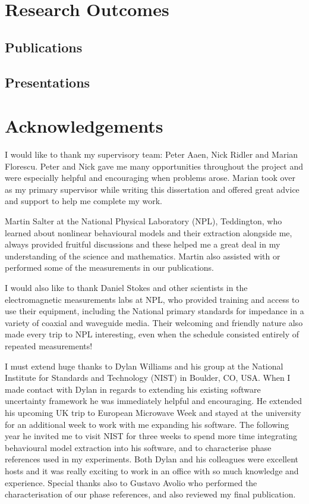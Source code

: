 \documentclass[../thesis/thesis.tex]{subfiles}
\begin{document}
\chapter*{Research Outcomes}
\begin{refsection}
\section*{Publications}
\nocite{Votsi_2020, Salter_2018, Stant_2018_TMTT, Stant_2017, Stant_2016, Stant_2016_Coll}
\printbibliography[heading=none]
\end{refsection}
\begin{refsection}
\section*{Presentations}
\nocite{Stant_2017_pgi, Stant_2017_feps, Stant_2016_pg}
\printbibliography[heading=none]
\end{refsection}
\chapter*{Acknowledgements}
I would like to thank my supervisory team: Peter Aaen, Nick Ridler and Marian Florescu. Peter and Nick gave me many opportunities throughout the project and were especially helpful and encouraging when problems arose. Marian took over as my primary supervisor while writing this dissertation and offered great advice and support to help me complete my work.

Martin Salter at the National Physical Laboratory (NPL), Teddington, who learned about nonlinear behavioural models and their extraction alongside me, always provided fruitful discussions and these helped me a great deal in my understanding of the science and mathematics. Martin also assisted with or performed some of the measurements in our publications.

I would also like to thank Daniel Stokes and other scientists in the electromagnetic measurements labs at NPL, who provided training and access to use their equipment, including the National primary standards for impedance in a variety of coaxial and waveguide media. Their welcoming and friendly nature also made every trip to NPL interesting, even when the schedule consisted entirely of repeated measurements!

I must extend huge thanks to Dylan Williams and his group at the National Institute for Standards and Technology (NIST) in Boulder, CO, USA. When I made contact with Dylan in regards to extending his existing software uncertainty framework he was immediately helpful and encouraging. He extended his upcoming UK trip to European Microwave Week and stayed at the university for an additional week to work with me expanding his software. The following year he invited me to visit NIST for three weeks to spend more time integrating behavioural model extraction into his software, and to characterise phase references used in my experiments. Both Dylan and his colleagues were excellent hosts and it was really exciting to work in an office with so much knowledge and experience. Special thanks also to Gustavo Avolio who performed the characterisation of our phase references, and also reviewed my final publication.
\end{document}
